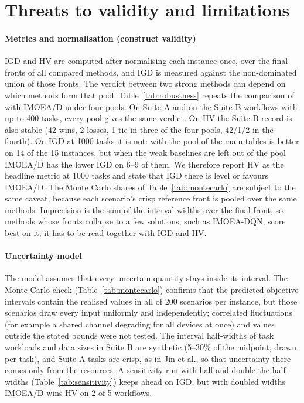 \section{Threats to validity and limitations}
\label{sec:validity}

\paragraph{Metrics and normalisation (construct validity)}
IGD and HV are computed after normalising each instance once, over the final fronts of all compared methods, and
IGD is measured against the non-dominated union of those fronts. The verdict between two strong methods can depend
on which methods form that pool. Table~\ref{tab:robustness} repeats the comparison of \ours{} with IMOEA/D under four
pools. On Suite A and on the Suite B workflows with up to 400 tasks, every pool gives the same verdict. On HV the
Suite B record is also stable (42 wins, 2 losses, 1 tie in three of the four pools, 42/1/2 in the fourth). On IGD
at 1000 tasks it is not: with the pool of the main tables \ours{} is better on 14 of the 15 instances, but when the
weak baselines are left out of the pool IMOEA/D has the lower IGD on 6--9 of them. We therefore report HV as the
headline metric at 1000 tasks and state that IGD there is level or favours IMOEA/D. The Monte Carlo shares of
Table~\ref{tab:montecarlo} are subject to the same caveat, because each scenario's crisp reference front is pooled
over the same methods. Imprecision is the sum of the interval widths over the final front, so methods whose fronts
collapse to a few solutions, such as IMOEA-DQN, score best on it; it has to be read together with IGD and HV.

\paragraph{Uncertainty model}
The model assumes that every uncertain quantity stays inside its interval. The Monte Carlo check
(Table~\ref{tab:montecarlo}) confirms that the predicted objective intervals contain the realised values in all of
200 scenarios per instance, but those scenarios draw every input uniformly and independently; correlated
fluctuations (for example a shared channel degrading for all devices at once) and values outside the stated bounds
were not tested. The interval half-widths of task workloads and data sizes in Suite B are synthetic (5--30\% of the
midpoint, drawn per task), and Suite A tasks are crisp, as in Jin et al., so that uncertainty there comes only from
the resources. A sensitivity run with half and double the half-widths (Table~\ref{tab:sensitivity}) keeps \ours{}
ahead on IGD, but with doubled widths IMOEA/D wins HV on 2 of 5 workflows.


